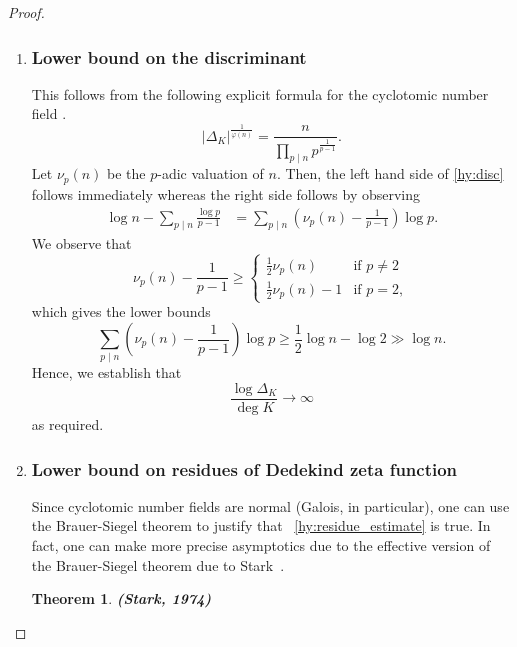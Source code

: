 \documentclass[a4paper]{article}
\newtheorem{theorem}{Theorem}
\theoremstyle{definition}
\theoremstyle{remark}
\begin{document}
\begin{proof}
\begin{enumerate}
\item  \subsubsection*{Lower bound on the discriminant}

This follows from the following explicit formula for the cyclotomic number field \cite{W12}.
\begin{equation}
| \Delta_K |^{\frac{1}{\varphi(n)}} = \frac{n}{  \prod_{p \mid n} p^{\frac{1}{p-1}} }.
\end{equation}
Let $\nu_p(n)$ be the $p$-adic valuation of $n$.
Then, the left hand side of \cref{hy:disc} follows immediately whereas the right side follows by observing
\begin{align}
	\log n - \sum_{p \mid n} \frac{\log p}{p-1} 
	& =  \sum_{p \mid n }
	\left(\nu_{p}(n) - \frac{1}{p-1}\right) \log p.
\end{align}
We observe that 
\begin{equation}
  \nu_p(n) - \frac{1}{p-1} \geq
  \begin{cases}
  \frac{1}{2} \nu_p(n) & \text{if } p \neq 2 \\
 \frac{1}{2} \nu_p(n) - 1 &  \text{if } p =2  ,
  \end{cases}
\end{equation}
  which gives the lower bounds 
  \begin{equation}
	\sum_{p \mid n}\left(\nu_{p}(n) - \frac{1}{p-1}\right) \log p \geq 
  \frac{1}{2}\log n  - \log 2 \gg \log n.
  \end{equation}
  Hence, we establish that 
  \begin{equation}
	  \frac{\log \Delta_{K}}{ \deg K} \rightarrow  \infty
  \end{equation}
  as required.

\item 
\subsubsection*{Lower bound on residues of Dedekind zeta function}

Since cyclotomic number fields are normal (Galois, in particular), one can use the Brauer-Siegel theorem to justify that 
~\cref{hy:residue_estimate} is true. In fact, one can make more precise asymptotics due to the effective version of the Brauer-Siegel theorem due to Stark~\cite{S1974}.

\begin{theorem}
\label{th:stark}
{\bf (Stark, 1974)}


\end{theorem}
\end{enumerate}
\end{proof}
\end{document}
